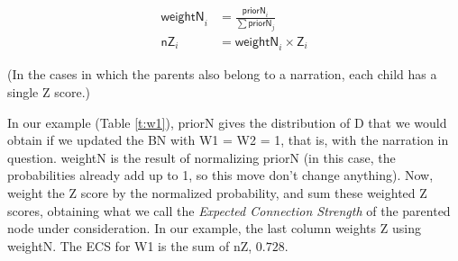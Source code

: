 \documentclass[10pt,]{scrartcl}
\newcommand{\s}[1]{\mbox{\textsf{#1}}}
\begin{document}
 \begin{align*}
    \mathsf{weightN}_i & = \frac{\mathsf{priorN}_i}{\sum \mathsf{priorN}_j}\\
    \mathsf{nZ}_{i} & = \mathsf{weightN}_i \times \mathsf{Z}_i
 \end{align*}
 
 
 \noindent (In  the cases in which the parents also belong to a narration,  each child has a single \s{Z} score.) 

 




 In our example (Table \ref{t:w1}), \textsf{priorN} gives the distribution of \textsf{D} that we would obtain if we updated the BN with \textsf{W1} = \textsf{W2} = 1, that is, with the narration in question.  \textsf{weightN} is the result of normalizing \textsf{priorN} (in this case, the probabilities already add up to 1, so this move don't change anything). Now, weight the Z score by the normalized probability, and sum these weighted Z scores, obtaining what we call the \emph{Expected Connection Strength} of the parented node under consideration.   In our example, the last column weights \textsf{Z} using  \textsf{weightN}. The \textsf{ECS} for \textsf{W1} is the sum of \textsf{nZ}, $0.728$.
\end{document}
